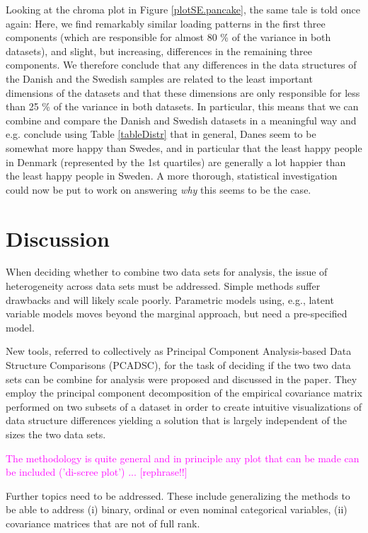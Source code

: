 \documentclass[titlepage,11pt,twoside]{article}
\newcommand{\hl}[1]{\textcolor{magenta}{#1}}
\begin{document}
{Looking at the chroma plot in Figure \ref{plotSE.pancake}, the same tale is told once again: Here, we find remarkably similar loading patterns in the first three components (which are responsible for almost 80 \% of the variance in both datasets), and slight, but increasing, differences in the remaining three components. We therefore conclude that any differences in the data structures of the Danish and the Swedish samples are related to the least important dimensions of the datasets and that these dimensions are only responsible for less than 25 \% of the variance in both datasets. In particular, this means that we can combine and compare the Danish and Swedish datasets in a meaningful way and e.g. conclude using Table \ref{tableDistr} that in general, Danes seem to be somewhat more happy than Swedes, and in particular that the least happy people in Denmark (represented by the 1st quartiles) are generally a lot happier than the least happy people in Sweden. A more thorough, statistical investigation could now be put to work on answering \textit{why} this seems to be the case.

\section{Discussion}
\label{sec.Discussion}
When deciding whether to combine two data sets for analysis, the issue of heterogeneity across data sets must be addressed. Simple methods suffer drawbacks and will likely scale poorly. Parametric models using, e.g., latent variable models moves beyond the marginal approach, but need a pre-specified model.

New tools, referred to collectively as Principal Component Analysis-based Data Structure Comparisons (PCADSC), for the task of deciding if the two two data sets can be combine for analysis were proposed and discussed in the paper. They employ the principal component decomposition of the empirical covariance matrix performed on two subsets of a dataset in order to create intuitive visualizations of data structure differences yielding a solution that is largely independent of the sizes  the two data sets.

\hl{
The methodology is quite general and in principle any plot that can be made can be included ('di-scree plot') ... [rephrase!!]
}

Further topics need to be addressed. These include generalizing the methods to be able to address (i) binary, ordinal or even nominal categorical variables, (ii) covariance matrices that are not of full rank.

}
\end{document}
